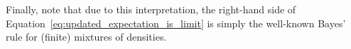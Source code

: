 \documentclass[3p]{elsarticle}
\newcommand{\nats}{\mathbb{N}}
\newcommand{\reals}{\mathbb{R}}
\newcommand{\realspos}{\reals_{>0}}
\newcommand{\realsnonneg}{\reals_{\geq 0}}
\newcommand{\states}{\mathcal{X}}
\newcommand{\observs}{\mathcal{Y}}
\newcommand{\coloneqq}{:\!=}
\begin{document}
Finally, note that due to this interpretation, the right-hand side of Equation~\eqref{eq:updated_expectation_is_limit} is simply the well-known Bayes' rule for (finite) mixtures of densities. 



\end{document}
